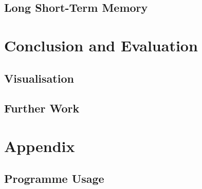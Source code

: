 \documentclass[11pt]{article} %
\theoremstyle{plain}
\theoremstyle{definition}
\begin{document}
\subsection{Long Short-Term Memory}

\section{Conclusion and Evaluation}
\subsection{Visualisation}
\subsection{Further Work}

\section{Appendix}
\subsection{Programme Usage}



\end{document}

